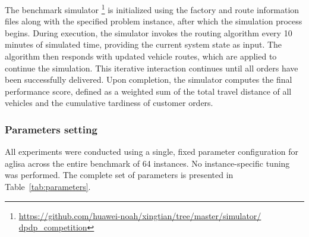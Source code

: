 \documentclass[preprint,12pt]{elsarticle}
\begin{document}
\begin{table}[htbp]
\centering
\caption{Dataset.}
\label{tab:dataset_settings}
\end{table}



The benchmark simulator \footnote{\hyperlink{https://github.com/huawei-noah/xingtian/tree/master/simulator/
dpdp_competition}{https://github.com/huawei-noah/xingtian/tree/master/simulator/
dpdp\_competition}} is initialized using the factory and route information files along with the specified problem instance, after which the simulation process begins. During execution, the simulator invokes the routing algorithm every 10 minutes of simulated time, providing the current system state as input. The algorithm then responds with updated vehicle routes, which are applied to continue the simulation. This iterative interaction continues until all orders have been successfully delivered. Upon completion, the simulator computes the final performance score, defined as a weighted sum of the total travel distance of all vehicles and the cumulative tardiness of customer orders. 

\subsubsection{Parameters setting} \label{ss:exp-params}

All experiments were conducted using a single, fixed parameter configuration for \gls{aglisa} across the entire benchmark of 64 instances. No instance-specific tuning was performed. The complete set of parameters is presented in Table~\ref{tab:parameters}.
\end{document}
